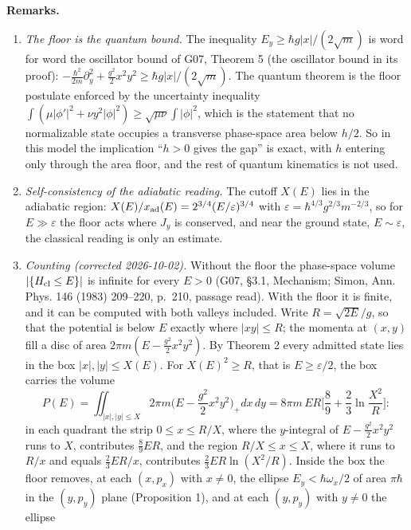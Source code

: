 \documentclass[11pt,a4paper]{article}
\begin{document}
\textbf{Remarks.}

\begin{enumerate}
\def\labelenumi{\arabic{enumi}.}
\item
  \emph{The floor is the quantum bound.} The inequality
  \(E_y\ge\hbar g|x|/(2\sqrt m)\) is word for word the oscillator bound
  of G07, Theorem 5 (the oscillator bound in its proof):
  \(-\frac{\hbar^2}{2m}\partial_y^2
  +\frac{g^2}{2}x^2y^2\ge\hbar g|x|/(2\sqrt m)\). The quantum theorem is
  the floor postulate enforced by the uncertainty inequality
  \(\int(\mu|\phi'|^2+\nu y^2|\phi|^2)\ge\sqrt{\mu\nu}\int|\phi|^2\),
  which is the statement that no normalizable state occupies a
  transverse phase-space area below \(h/2\). So in this model the
  implication ``\(h>0\) gives the gap'' is exact, with \(h\) entering
  only through the area floor, and the rest of quantum kinematics is not
  used.
\item
  \emph{Self-consistency of the adiabatic reading.} The cutoff \(X(E)\)
  lies in the adiabatic region:
  \(X(E)/x_{\rm ad}(E)=2^{3/4}(E/\varepsilon)^{3/4}\) with
  \(\varepsilon=\hbar^{4/3}g^{2/3}m^{-2/3}\), so for \(E\gg\varepsilon\)
  the floor acts where \(J_y\) is conserved, and near the ground state,
  \(E\sim\varepsilon\), the classical reading is only an estimate.
\item
  \emph{Counting (corrected 2026-10-02).} Without the floor the
  phase-space volume \(|\{H_{\rm cl}\le E\}|\) is infinite for every
  \(E>0\) (G07, §3.1, Mechanism; Simon, Ann. Phys. 146 (1983) 209--220,
  p.~210, passage read). With the floor it is finite, and it can be
  computed with both valleys included. Write \(R=\sqrt{2E}/g\), so that
  the potential is below \(E\) exactly where \(|xy|\le R\); the momenta
  at \((x,y)\) fill a disc of area \(2\pi m(E-\tfrac{g^2}{2}x^2y^2)\).
  By Theorem 2 every admitted state lies in the box \(|x|,|y|\le X(E)\).
  For \(X(E)^2\ge R\), that is \(E\ge\varepsilon/2\), the box carries
  the volume
  \[P(E)=\iint_{|x|,|y|\le X}2\pi m\Big(E-\frac{g^2}{2}x^2y^2\Big)_+dx\,dy
  =8\pi m\,ER\Big[\frac89+\frac23\ln\frac{X^2}{R}\Big]:\] in each
  quadrant the strip \(0\le x\le R/X\), where the \(y\)-integral of
  \(E-\tfrac{g^2}2x^2y^2\) runs to \(X\), contributes \(\tfrac89ER\),
  and the region \(R/X\le x\le X\), where it runs to \(R/x\) and equals
  \(\tfrac23ER/x\), contributes \(\tfrac23ER\ln(X^2/R)\). Inside the box
  the floor removes, at each \((x,p_x)\) with \(x\ne0\), the ellipse
  \(E_y<\hbar\omega_x/2\) of area \(\pi\hbar\) in the \((y,p_y)\) plane
  (Proposition 1), and at each \((y,p_y)\) with \(y\ne0\) the ellipse

\end{enumerate}
\end{document}
